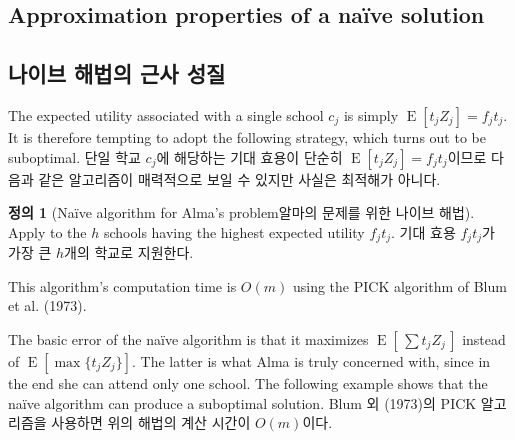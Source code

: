 \documentclass[11pt]{article} %
\theoremstyle{definition}
\newtheorem{definition}{Definition}
\theoremstyle{definition}
\newtheorem{definition}{정의}
\begin{document}
\ifen \subsection{Approximation properties of a na\"ive solution}  \else \subsection{나이브 해법의 근사 성질} \fi
\ifen
The expected utility associated with a single school $c_j$ is simply $\operatorname{E}[t_j Z_j] = f_j t_j$. It is therefore tempting to adopt the following strategy, which turns out to be suboptimal.
\else 
단일 학교 $c_j$에 해당하는 기대 효용이 단순히 $\operatorname{E}[t_j Z_j] = f_j t_j$이므로 다음과 같은 알고리즘이 매력적으로 보일 수 있지만 사실은 최적해가 아니다.
\fi
\begin{definition}[\ifen Na\"ive algorithm for Alma’s problem\else 알마의 문제를 위한 나이브 해법\fi] \label{naivealgorithm}
\ifen 
Apply to the $h$ schools having the highest expected utility $f_j t_j$.
\else
기대 효용 $f_j t_j$가 가장 큰 $h$개의 학교로 지원한다.
\fi
\end{definition}
\ifen 
\noindent This algorithm's computation time is $O(m)$ using the PICK algorithm of Blum et al. (1973).

The basic error of the na\"ive algorithm is that it maximizes $\operatorname{E}\left[\,\sum t_j Z_j\, \right]$ instead of $\operatorname{E}\left[\max \{t_j Z_j\} \right]$. The latter is what Alma is truly concerned with, since in the end she can attend only one school. The following example shows that the na\"ive algorithm can produce a suboptimal solution.
\else
\noindent Blum 외 (1973)의 PICK 알고리즘을 사용하면 위의 해법의 계산 시간이 $O(m)$이다.
\end{document}
